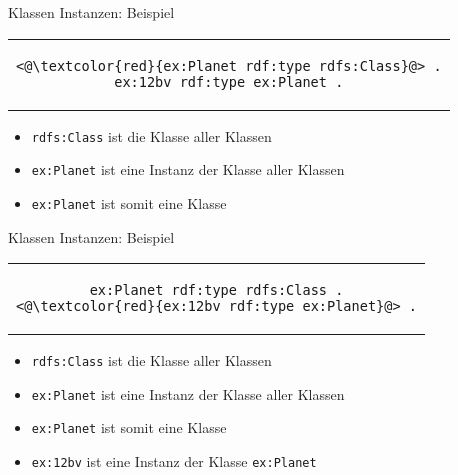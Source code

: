 \documentclass{beamer}
\begin{document}
\begin{frame}[fragile]{Klassen Instanzen: Beispiel}
	
	\begin{center}
		\begin{tabular}{c}
			\begin{lstlisting}
<@\textcolor{red}{ex:Planet rdf:type rdfs:Class}@> .
ex:12bv rdf:type ex:Planet .
			\end{lstlisting}
		\end{tabular}
	\end{center}
	
	\vspace{0.5cm}
	
	\begin{itemize}
		\item {\color{lightgray} \texttt{rdfs:Class} ist die Klasse aller Klassen}
		\item \texttt{ex:Planet} ist eine Instanz der Klasse aller Klassen
		\item \texttt{ex:Planet} ist somit eine Klasse
	\end{itemize}
	
\end{frame}

\begin{frame}[fragile]{Klassen Instanzen: Beispiel}
	
	\begin{center}
		\begin{tabular}{c}
			\begin{lstlisting}
ex:Planet rdf:type rdfs:Class .
<@\textcolor{red}{ex:12bv rdf:type ex:Planet}@> .
			\end{lstlisting}
		\end{tabular}
	\end{center}
	
	\vspace{0.5cm}
	
	\begin{itemize}
		\item {\color{lightgray} \texttt{rdfs:Class} ist die Klasse aller Klassen}
		\item {\color{lightgray} \texttt{ex:Planet} ist eine Instanz der Klasse aller Klassen}
		\item {\color{lightgray} \texttt{ex:Planet} ist somit eine Klasse}
		\item \texttt{ex:12bv} ist eine Instanz der Klasse \texttt{ex:Planet}
	\end{itemize}
	
\end{frame}
\end{document}
